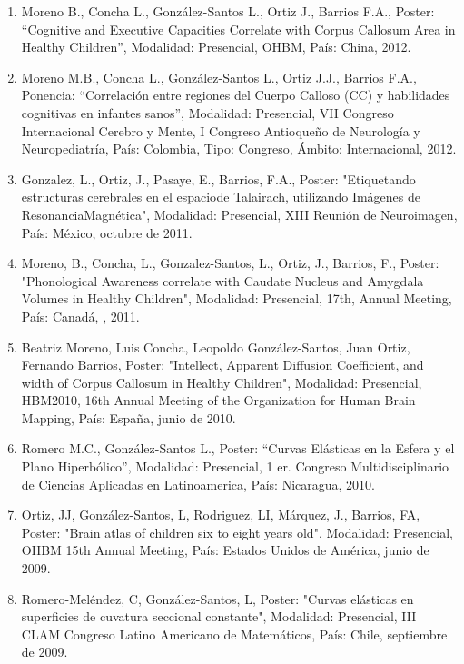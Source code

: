 \begin{enumerate}
\item Moreno B., Concha L., González-Santos L., Ortiz J., Barrios F.A., Poster: “Cognitive and Executive Capacities Correlate 
with Corpus Callosum Area in Healthy Children”, Modalidad: Presencial, OHBM, País: China, 2012.

\item Moreno M.B., Concha L., González-Santos L., Ortiz J.J., Barrios F.A., Ponencia: “Correlación entre regiones del Cuerpo 
Calloso (CC) y habilidades cognitivas en infantes sanos”, Modalidad: Presencial, VII Congreso Internacional Cerebro y 
Mente, I Congreso Antioqueño de Neurología y Neuropediatría, País: Colombia, Tipo: Congreso, Ámbito: Internacional, 2012.

\item Gonzalez, L., Ortiz, J., Pasaye, E., Barrios, F.A., Poster: "Etiquetando estructuras cerebrales en el espaciode 
Talairach, utilizando Imágenes de ResonanciaMagnética", Modalidad: Presencial, XIII Reunión de Neuroimagen, País: México, octubre de 2011.

\item Moreno, B., Concha, L., Gonzalez-Santos, L., Ortiz, J., Barrios, F., Poster: "Phonological Awareness correlate with 
Caudate Nucleus and Amygdala Volumes in Healthy Children", Modalidad: Presencial, 17th, Annual Meeting, País: Canadá, , 2011.

\item Beatriz Moreno, Luis Concha, Leopoldo González-Santos, Juan Ortiz, Fernando Barrios, Poster: "Intellect, Apparent 
Diffusion Coefficient, and width of Corpus Callosum in Healthy Children", Modalidad: Presencial, HBM2010, 16th Annual 
Meeting of the Organization for Human Brain Mapping, País: España, junio de 2010.

\item Romero M.C., González-Santos L., Poster: “Curvas Elásticas en la Esfera y el Plano Hiperbólico”, Modalidad: Presencial, 
1 er. Congreso Multidisciplinario de Ciencias Aplicadas en Latinoamerica, País: Nicaragua, 2010.

\item Ortiz, JJ, González-Santos, L, Rodriguez, LI, Márquez, J., Barrios, FA, Poster: "Brain atlas of children six to eight 
years old", Modalidad: Presencial, OHBM 15th Annual Meeting, País: Estados Unidos de América, junio de 2009.

\item Romero-Meléndez, C, González-Santos, L, Poster: "Curvas elásticas en superficies de cuvatura seccional constante", 
Modalidad: Presencial, III CLAM Congreso Latino Americano de Matemáticos, País: Chile, septiembre de 2009.


\end{enumerate}
